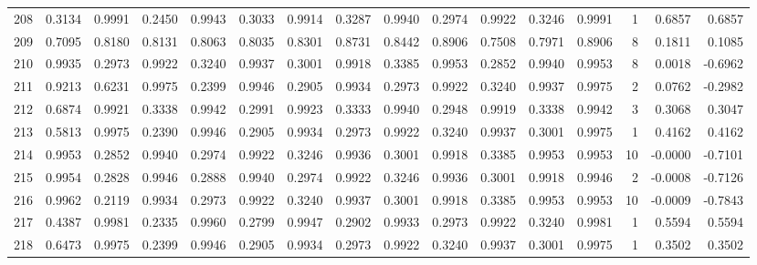 \begin{tabular}{lrrrrrrrrrrrrrrr}
208 &      0.3134 &  0.9991 &  0.2450 &  0.9943 &  0.3033 &  0.9914 &  0.3287 &  0.9940 &  0.2974 &  0.9922 &   0.3246 &     0.9991 &      1 &                    0.6857 &                     0.6857 \\
209 &      0.7095 &  0.8180 &  0.8131 &  0.8063 &  0.8035 &  0.8301 &  0.8731 &  0.8442 &  0.8906 &  0.7508 &   0.7971 &     0.8906 &      8 &                    0.1811 &                     0.1085 \\
210 &      0.9935 &  0.2973 &  0.9922 &  0.3240 &  0.9937 &  0.3001 &  0.9918 &  0.3385 &  0.9953 &  0.2852 &   0.9940 &     0.9953 &      8 &                    0.0018 &                    -0.6962 \\
211 &      0.9213 &  0.6231 &  0.9975 &  0.2399 &  0.9946 &  0.2905 &  0.9934 &  0.2973 &  0.9922 &  0.3240 &   0.9937 &     0.9975 &      2 &                    0.0762 &                    -0.2982 \\
212 &      0.6874 &  0.9921 &  0.3338 &  0.9942 &  0.2991 &  0.9923 &  0.3333 &  0.9940 &  0.2948 &  0.9919 &   0.3338 &     0.9942 &      3 &                    0.3068 &                     0.3047 \\
213 &      0.5813 &  0.9975 &  0.2390 &  0.9946 &  0.2905 &  0.9934 &  0.2973 &  0.9922 &  0.3240 &  0.9937 &   0.3001 &     0.9975 &      1 &                    0.4162 &                     0.4162 \\
214 &      0.9953 &  0.2852 &  0.9940 &  0.2974 &  0.9922 &  0.3246 &  0.9936 &  0.3001 &  0.9918 &  0.3385 &   0.9953 &     0.9953 &     10 &                   -0.0000 &                    -0.7101 \\
215 &      0.9954 &  0.2828 &  0.9946 &  0.2888 &  0.9940 &  0.2974 &  0.9922 &  0.3246 &  0.9936 &  0.3001 &   0.9918 &     0.9946 &      2 &                   -0.0008 &                    -0.7126 \\
216 &      0.9962 &  0.2119 &  0.9934 &  0.2973 &  0.9922 &  0.3240 &  0.9937 &  0.3001 &  0.9918 &  0.3385 &   0.9953 &     0.9953 &     10 &                   -0.0009 &                    -0.7843 \\
217 &      0.4387 &  0.9981 &  0.2335 &  0.9960 &  0.2799 &  0.9947 &  0.2902 &  0.9933 &  0.2973 &  0.9922 &   0.3240 &     0.9981 &      1 &                    0.5594 &                     0.5594 \\
218 &      0.6473 &  0.9975 &  0.2399 &  0.9946 &  0.2905 &  0.9934 &  0.2973 &  0.9922 &  0.3240 &  0.9937 &   0.3001 &     0.9975 &      1 &                    0.3502 &                     0.3502 \\

\end{tabular}
